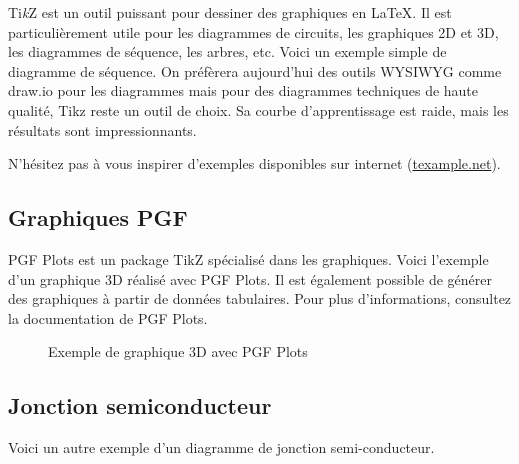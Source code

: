 Ti\textit{k}Z est un outil puissant pour dessiner des graphiques en \LaTeX. Il est particulièrement utile pour les diagrammes de circuits, les graphiques 2D et 3D, les diagrammes de séquence, les arbres, etc. Voici un exemple simple de diagramme de séquence. On préfèrera aujourd'hui des outils WYSIWYG comme draw.io pour les diagrammes mais pour des diagrammes techniques de haute qualité, Tikz reste un outil de choix. Sa courbe d'apprentissage est raide, mais les résultats sont impressionnants.

N'hésitez pas à vous inspirer d'exemples disponibles sur internet (\href{https://texample.net/category/science-technology/}{texample.net}).

\subsection{Graphiques PGF}

PGF Plots est un package TikZ spécialisé dans les graphiques. Voici l'exemple d'un graphique 3D réalisé avec PGF Plots. Il est également possible de générer des graphiques à partir de données tabulaires. Pour plus d'informations, consultez la documentation de PGF Plots.

\begin{figure}[H]
    \centering
    \caption{Exemple de graphique 3D avec PGF Plots}
\end{figure}

\subsection{Jonction semiconducteur}

Voici un autre exemple d'un diagramme de jonction semi-conducteur.

